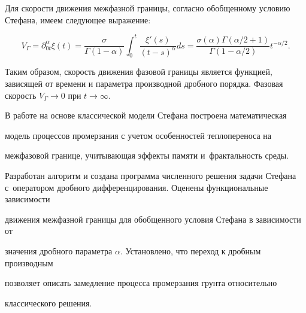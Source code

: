 Для скорости движения межфазной границы, согласно обобщенному условию Стефана, имеем следующее выражение:

\[

V_\Gamma =\partial _{0t}^\alpha \xi (t)=\frac{\sigma }{\Gamma (1-\alpha 

)}\int _0^t {\frac{\xi'(s)}{(t-s)^\alpha }} ds=

\frac{\sigma (\alpha )  \Gamma ( {\alpha }/{2}+1 )}{\Gamma (  1-{\alpha }/{2})}  t^{-{\alpha }/{2}}.

\]



Таким образом, скорость движения фазовой границы является функцией, зависящей от времени и параметра производной дробного порядка. Фазовая скорость  $V_\Gamma \to 0$ при $t\to \infty $.












В работе на основе классической модели Стефана построена математическая 

модель процессов промерзания с учетом особенностей теплопереноса на 

межфазовой границе, учитывающая эффекты памяти и~фрактальность среды. 

Разработан алгоритм и создана программа численного решения задачи Стефана с~оператором дробного дифференцирования. Оценены функциональные зависимости 

движения межфазной границы для обобщенного условия Стефана в зависимости от 

значения дробного параметра $\alpha $. Установлено, что переход к дробным производным 

позволяет описать замедление процесса промерзания грунта относительно 

классического решения.









